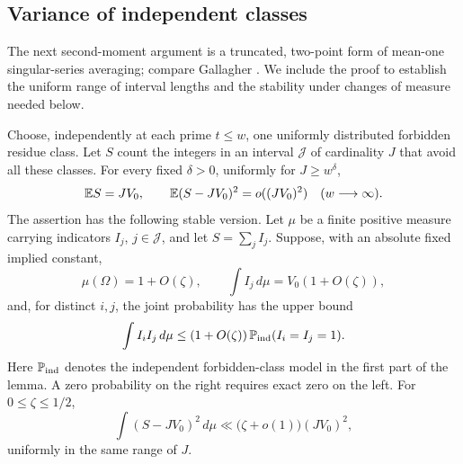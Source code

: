\subsection{Variance of independent classes}

The next second-moment argument is a truncated, two-point form of
mean-one singular-series averaging; compare Gallagher
\cite[equation~(3) and Section~2]{Gallagher1976}.
We include the proof to establish the uniform range of interval lengths
and the stability under changes of measure needed below.

\begin{lemma}\label{lem:random-variance}
Choose, independently at each prime \(t\le w\), one uniformly distributed
forbidden residue class. Let \(S\) count the integers in an interval
\(\mathcal J\) of cardinality \(J\) that avoid all these classes.
For every fixed \(\delta>0\), uniformly for \(J\ge w^\delta\),
\[
 \mathbb E S=JV_0,\qquad
 \mathbb E(S-JV_0)^2=o((JV_0)^2)
 \quad(w\longrightarrow\infty).
 \]
The assertion has the following stable version. Let \(\mu\) be a finite
positive measure carrying indicators \(I_j\), \(j\in\mathcal J\), and let
\(S=\sum_j I_j\). Suppose, with an absolute fixed implied constant,
\[
 \mu(\Omega)=1+O(\zeta),\qquad
 \int I_j\,d\mu=V_0(1+O(\zeta)),
 \]
and, for distinct \(i,j\), the joint probability has the upper bound
\[
 \int I_iI_j\,d\mu
 \le(1+O(\zeta))\,\mathbb P_{\rm ind}(I_i=I_j=1).
 \]
Here \(\mathbb P_{\rm ind}\) denotes the independent forbidden-class model
in the first part of the lemma. A zero probability on the right requires
exact zero on the left.
For \(0\le\zeta\le1/2\),
\[
 \int(S-JV_0)^2\,d\mu
 \ll\bigl(\zeta+o(1)\bigr)(JV_0)^2,
 \]
uniformly in the same range of \(J\).
\end{lemma}


